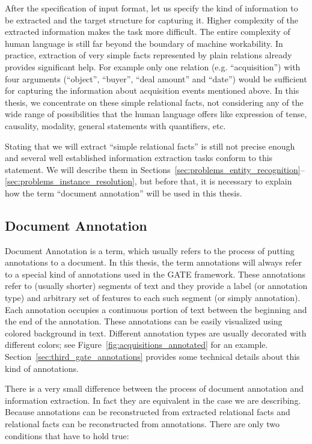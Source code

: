 After the specification of input format, let us specify the kind of information to be extracted and the target structure for capturing it. Higher complexity of the extracted information makes the task more difficult. The entire complexity of human language is still far beyond the boundary of machine workability. In practice, extraction of very simple facts represented by plain relations already provides significant help. For example only one relation (e.g. “acquisition”) with four arguments (“object”, “buyer”, “deal amount” and “date”) would be sufficient for capturing the information about acquisition events mentioned above. In this thesis, we concentrate on these simple relational facts, not considering any of the wide range of possibilities that the human language offers like expression of tense, causality, modality, general statements with quantifiers, etc.



Stating that we will extract “simple relational facts” is still not precise enough and several well established information extraction tasks conform to this statement. We will describe them in Sections~\ref{sec:problems_entity_recognition}--\ref{sec:problems_instance_resolution}, but before that, it is necessary to explain how the term “document annotation” will be used in this thesis.

\subsection{Document Annotation}

Document Annotation is a term, which usually refers to the process of putting annotations to a document. In this thesis, the term annotations will always refer to a special kind of annotations used in the GATE framework.  These annotations refer to (usually shorter) segments of text and they provide a label (or annotation type) and arbitrary set of features to each such segment (or simply annotation). Each annotation occupies a continuous portion of text between the beginning and the end of the annotation. These annotations can be easily visualized using colored background in text. Different annotation types are usually decorated with different colors; see Figure~\ref{fig:acquisitions_annotated} for an example. Section~\ref{sec:third_gate_annotations} provides some technical details about this kind of annotations.

There is a very small difference between the process of document annotation and information extraction. In fact they are equivalent in the case we are describing. Because annotations can be reconstructed from extracted relational facts and relational facts can be reconstructed from annotations. There are only two conditions that have to hold true:

